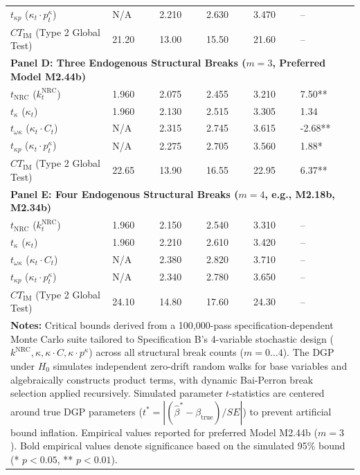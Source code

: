 \begin{table}[H]
\begin{tabular}{p{4.2cm} p{2.2cm} p{1.8cm} p{1.8cm} p{1.8cm} p{2.0cm}}
		$t_{\kappa p}$ ($\kappa_t \cdot p^{\kappa}_t$) & N/A & 2.210 & 2.630 & 3.470 & -- \\
		$CT_{\text{IM}}$ (Type 2 Global Test) & 21.20 & 13.00 & 15.50 & 21.60 & -- \\
		\midrule
		\multicolumn{6}{l}{\textbf{Panel D: Three Endogenous Structural Breaks ($m=3$, Preferred Model M2.44b)}} \\
		\midrule
		$t_{\text{NRC}}$ ($k^{\text{NRC}}_t$) & 1.960 & 2.075 & 2.455 & 3.210 & 7.50** \\
		$t_{\kappa}$ ($\kappa_t$) & 1.960 & 2.130 & 2.515 & 3.305 & 1.34 \\
		$t_{\omega \kappa}$ ($\kappa_t \cdot C_t$) & N/A & 2.315 & 2.745 & 3.615 & -2.68** \\
		$t_{\kappa p}$ ($\kappa_t \cdot p^{\kappa}_t$) & N/A & 2.275 & 2.705 & 3.560 & 1.88* \\
		$CT_{\text{IM}}$ (Type 2 Global Test) & 22.65 & 13.90 & 16.55 & 22.95 & 6.37** \\
		\midrule
		\multicolumn{6}{l}{\textbf{Panel E: Four Endogenous Structural Breaks ($m=4$, e.g., M2.18b, M2.34b)}} \\
		\midrule
		$t_{\text{NRC}}$ ($k^{\text{NRC}}_t$) & 1.960 & 2.150 & 2.540 & 3.310 & -- \\
		$t_{\kappa}$ ($\kappa_t$) & 1.960 & 2.210 & 2.610 & 3.420 & -- \\
		$t_{\omega \kappa}$ ($\kappa_t \cdot C_t$) & N/A & 2.380 & 2.820 & 3.710 & -- \\
		$t_{\kappa p}$ ($\kappa_t \cdot p^{\kappa}_t$) & N/A & 2.340 & 2.780 & 3.650 & -- \\
		$CT_{\text{IM}}$ (Type 2 Global Test) & 24.10 & 14.80 & 17.60 & 24.30 & -- \\
		\bottomrule
		\multicolumn{6}{p{14.8cm}}{\footnotesize \textbf{Notes:} Critical bounds derived from a 100,000-pass specification-dependent Monte Carlo suite tailored to Specification B's 4-variable stochastic design ($k^{\text{NRC}}, \kappa, \kappa \cdot C, \kappa \cdot p^{\kappa}$) across all structural break counts ($m=0 \dots 4$). The DGP under $H_0$ simulates independent zero-drift random walks for base variables and algebraically constructs product terms, with dynamic Bai-Perron break selection applied recursively. Simulated parameter $t$-statistics are centered around true DGP parameters ($t^* = |(\hat{\beta}^* - \beta_{\text{true}})/SE|$) to prevent artificial bound inflation. Empirical values reported for preferred Model M2.44b ($m=3$). Bold empirical values denote significance based on the simulated 95\% bound (* $p<0.05$, ** $p<0.01$).} \\
	\end{tabular}
\end{table}